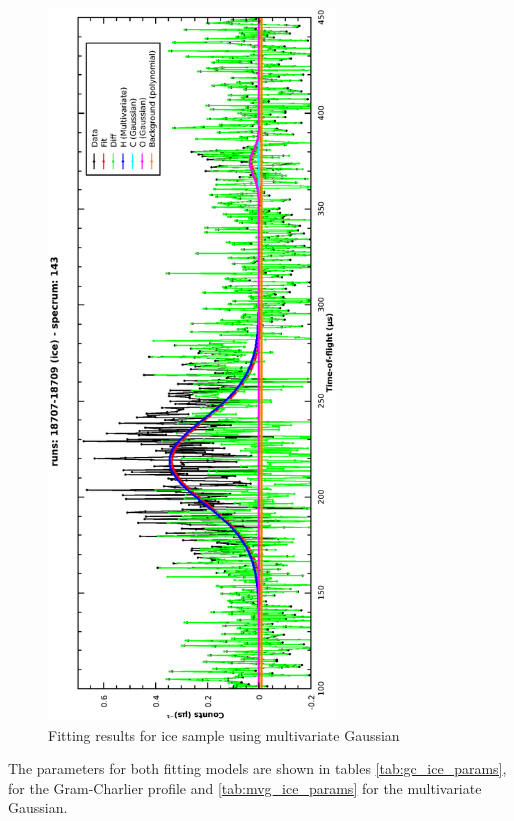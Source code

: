 \documentclass[a4paper]{article}
\begin{document}
\begin{figure}[h!]
  \centering
  \vspace{-60pt}
  \begin{turn}{-90}
    \includegraphics[width=0.68\textwidth]{graphics/cs_ice_mvg.eps}
  \end{turn}
  \vspace{-60pt}
  \caption{Fitting results for ice sample using multivariate Gaussian}
  \label{fig:mvg_ice_fit}
\end{figure}
\FloatBarrier

The parameters for both fitting models are shown in tables
\ref{tab:gc_ice_params}, for the Gram-Charlier profile and
\ref{tab:mvg_ice_params} for the multivariate Gaussian.
\end{document}
